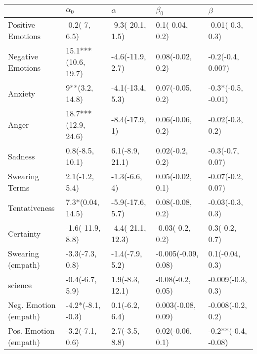 \begin{tabular}{lllll}
\toprule
{} &           $\alpha_0$ &           $\alpha$ &            $\beta_0$ &              $\beta$ \\
\midrule
Positive Emotions     &        -0.2(-7, 6.5) &   -9.3(-20.1, 1.5) &      0.1(-0.04, 0.2) &     -0.01(-0.3, 0.3) \\
Negative Emotions     &  15.1***(10.6, 19.7) &   -4.6(-11.9, 2.7) &     0.08(-0.02, 0.2) &    -0.2(-0.4, 0.007) \\
Anxiety               &       9**(3.2, 14.8) &   -4.1(-13.4, 5.3) &     0.07(-0.05, 0.2) &   -0.3*(-0.5, -0.01) \\
Anger                 &  18.7***(12.9, 24.6) &     -8.4(-17.9, 1) &     0.06(-0.06, 0.2) &     -0.02(-0.3, 0.2) \\
Sadness               &      0.8(-8.5, 10.1) &    6.1(-8.9, 21.1) &      0.02(-0.2, 0.2) &     -0.3(-0.7, 0.07) \\
Swearing Terms        &       2.1(-1.2, 5.4) &      -1.3(-6.6, 4) &     0.05(-0.02, 0.1) &    -0.07(-0.2, 0.07) \\
Tentativeness         &     7.3*(0.04, 14.5) &   -5.9(-17.6, 5.7) &     0.08(-0.08, 0.2) &     -0.03(-0.3, 0.3) \\
Certainty             &     -1.6(-11.9, 8.8) &  -4.4(-21.1, 12.3) &     -0.03(-0.2, 0.2) &       0.3(-0.2, 0.7) \\
Swearing (empath)     &      -3.3(-7.3, 0.8) &    -1.4(-7.9, 5.2) &  -0.005(-0.09, 0.08) &      0.1(-0.04, 0.3) \\
science               &      -0.4(-6.7, 5.9) &    1.9(-8.3, 12.1) &    -0.08(-0.2, 0.05) &    -0.009(-0.3, 0.3) \\
Neg. Emotion (empath) &    -4.2*(-8.1, -0.3) &     0.1(-6.2, 6.4) &   0.003(-0.08, 0.09) &    -0.008(-0.2, 0.2) \\
Pos. Emotion (empath) &      -3.2(-7.1, 0.6) &     2.7(-3.5, 8.8) &     0.02(-0.06, 0.1) &  -0.2**(-0.4, -0.08) \\
\bottomrule
\end{tabular}
